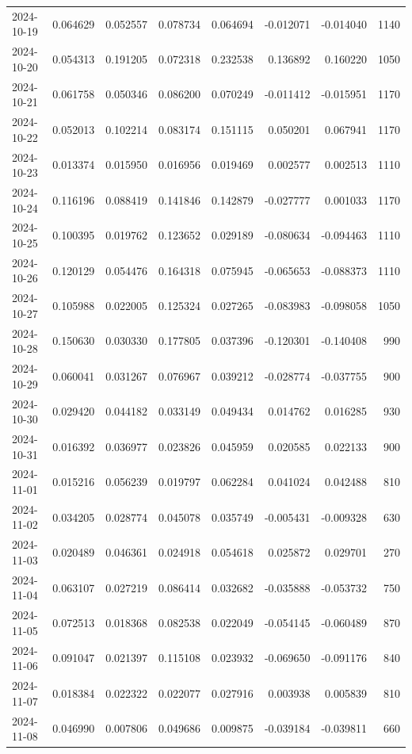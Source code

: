 \begin{tabular}{lrrrrrrr}
2024-10-19 & 0.064629 & 0.052557 & 0.078734 & 0.064694 & -0.012071 & -0.014040 & 1140 \\
2024-10-20 & 0.054313 & 0.191205 & 0.072318 & 0.232538 & 0.136892 & 0.160220 & 1050 \\
2024-10-21 & 0.061758 & 0.050346 & 0.086200 & 0.070249 & -0.011412 & -0.015951 & 1170 \\
2024-10-22 & 0.052013 & 0.102214 & 0.083174 & 0.151115 & 0.050201 & 0.067941 & 1170 \\
2024-10-23 & 0.013374 & 0.015950 & 0.016956 & 0.019469 & 0.002577 & 0.002513 & 1110 \\
2024-10-24 & 0.116196 & 0.088419 & 0.141846 & 0.142879 & -0.027777 & 0.001033 & 1170 \\
2024-10-25 & 0.100395 & 0.019762 & 0.123652 & 0.029189 & -0.080634 & -0.094463 & 1110 \\
2024-10-26 & 0.120129 & 0.054476 & 0.164318 & 0.075945 & -0.065653 & -0.088373 & 1110 \\
2024-10-27 & 0.105988 & 0.022005 & 0.125324 & 0.027265 & -0.083983 & -0.098058 & 1050 \\
2024-10-28 & 0.150630 & 0.030330 & 0.177805 & 0.037396 & -0.120301 & -0.140408 & 990 \\
2024-10-29 & 0.060041 & 0.031267 & 0.076967 & 0.039212 & -0.028774 & -0.037755 & 900 \\
2024-10-30 & 0.029420 & 0.044182 & 0.033149 & 0.049434 & 0.014762 & 0.016285 & 930 \\
2024-10-31 & 0.016392 & 0.036977 & 0.023826 & 0.045959 & 0.020585 & 0.022133 & 900 \\
2024-11-01 & 0.015216 & 0.056239 & 0.019797 & 0.062284 & 0.041024 & 0.042488 & 810 \\
2024-11-02 & 0.034205 & 0.028774 & 0.045078 & 0.035749 & -0.005431 & -0.009328 & 630 \\
2024-11-03 & 0.020489 & 0.046361 & 0.024918 & 0.054618 & 0.025872 & 0.029701 & 270 \\
2024-11-04 & 0.063107 & 0.027219 & 0.086414 & 0.032682 & -0.035888 & -0.053732 & 750 \\
2024-11-05 & 0.072513 & 0.018368 & 0.082538 & 0.022049 & -0.054145 & -0.060489 & 870 \\
2024-11-06 & 0.091047 & 0.021397 & 0.115108 & 0.023932 & -0.069650 & -0.091176 & 840 \\
2024-11-07 & 0.018384 & 0.022322 & 0.022077 & 0.027916 & 0.003938 & 0.005839 & 810 \\
2024-11-08 & 0.046990 & 0.007806 & 0.049686 & 0.009875 & -0.039184 & -0.039811 & 660 \\

\end{tabular}
